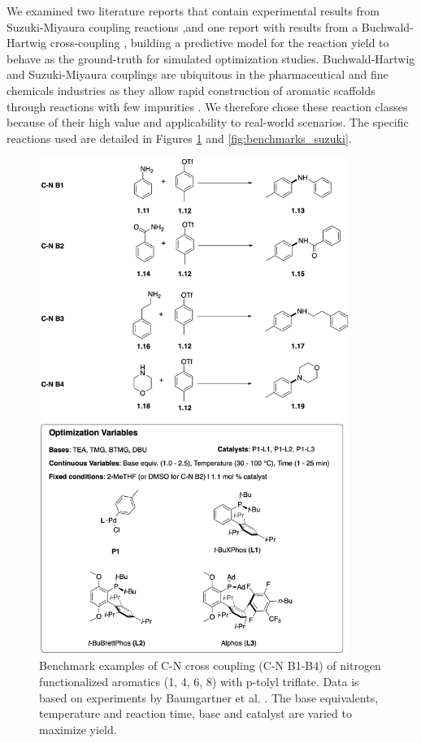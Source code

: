 We examined two literature reports that contain experimental results from Suzuki-Miyaura coupling reactions \cite{Baumgartner2018, Reizman2016b} ,and one report with results from a Buchwald-Hartwig cross-coupling \cite{Baumgartner2019}, building a predictive model for the reaction yield to behave as the ground-truth for simulated optimization studies. Buchwald-Hartwig and Suzuki-Miyaura couplings are ubiquitous in the pharmaceutical and fine chemicals industries as they allow rapid construction of aromatic scaffolds through reactions with few impurities \cite{Brown2016}. We therefore chose these reaction classes because of their high value and applicability to real-world scenarios. The specific reactions used are detailed in Figures \ref{fig:benchmarks_cn} and \ref{fig:benchmarks_suzuki}.


\begin{figure}
    \centering
    \includegraphics[width=0.9\textwidth]{gfx/Chapter04/c_n_benchmarks_thesis.png}
    \caption{Benchmark examples of C-N cross coupling (C-N B1-B4) of nitrogen functionalized aromatics (1, 4, 6, 8) with p-tolyl triflate. Data is based on experiments by Baumgartner et al. 
 \cite{Baumgartner2019}. The base equivalents, temperature and reaction time, base and catalyst are varied to maximize yield.}
    \label{fig:benchmarks_cn}
\end{figure}


